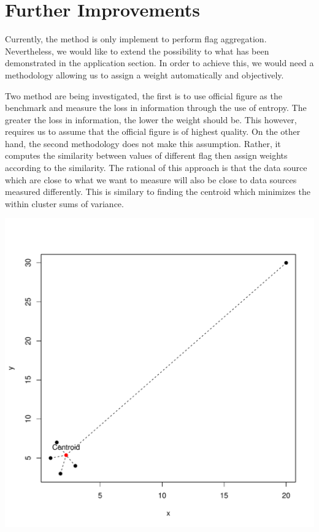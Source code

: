 \documentclass[nojss]{jss}\usepackage[]{graphicx}\usepackage[]{color}
\makeatletter
\def\maxwidth{ %
  \ifdim\Gin@nat@width>\linewidth
    \linewidth
  \else
    \Gin@nat@width
  \fi
}
\newenvironment{knitrout}{}{} %
\makeatother
\begin{document}
\section{Further Improvements}
Currently, the method is only implement to perform flag
aggregation. Nevertheless, we would like to extend the possibility to
what has been demonstrated in the application section. In order to
achieve this, we would need a methodology allowing us to assign a
weight automatically and objectively.

Two method are being investigated, the first is to use official figure
as the benchmark and measure the loss in information through the use
of entropy. The greater the loss in information, the lower the weight
should be. This however, requires us to assume that the official
figure is of highest quality. On the other hand, the second
methodology does not make this assumption. Rather, it computes the
similarity between values of different flag then assign weights
according to the similarity. The rational of this approach is that the
data source which are close to what we want to measure will also be
close to data sources measured differently. This is similary to
finding the centroid which minimizes the within cluster sums of
variance.

\begin{knitrout}
\color{fgcolor}

{\centering \includegraphics[width=\maxwidth]{figure/illustration} 

}



\end{knitrout}
\end{document}
